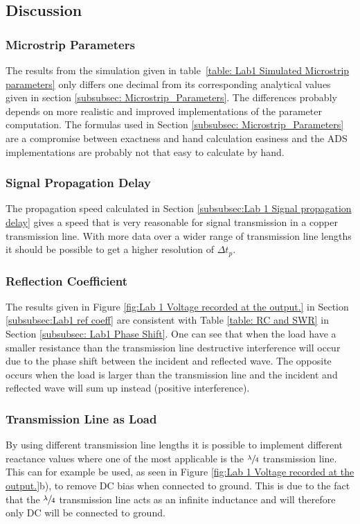 \documentclass[report.tex]{subfiles}
\begin{document}
\subsection{Discussion}
\subsubsection{Microstrip Parameters}
The results from the simulation given in table~\ref{table: Lab1 Simulated Microstrip parameters} only differs one decimal from its corresponding analytical values given in section \ref{subsubsec: Microstrip_Parameters}. The differences probably depends on more realistic and improved implementations of the parameter computation. The formulas used in Section \ref{subsubsec: Microstrip_Parameters} are a compromise between exactness and hand calculation easiness and the ADS implementations are probably not that easy to calculate by hand.
\subsubsection{Signal Propagation Delay}
The propagation speed calculated in Section \ref{subsubsec:Lab 1 Signal propagation delay} gives a speed that is very reasonable for signal transmission in a copper transmission line. With more data over a wider range of transmission line lengths it should be possible to get a higher resolution of $\Delta t_p$.
\subsubsection{Reflection Coefficient}
The results given in Figure \ref{fig:Lab 1 Voltage recorded at the output.} in Section \ref{subsubsec:Lab1 ref coeff} are consistent with Table \ref{table: RC and SWR} in Section \ref{subsubsec: Lab1 Phase Shift}. One can see that when the load have a smaller resistance than the transmission line destructive interference will occur due to the phase shift between the incident and reflected wave. The opposite occurs when the load is larger than the transmission line and the incident and reflected wave will sum up instead (positive interference).
\subsubsection{Transmission Line as Load}
By using different transmission line lengths it is possible to implement different reactance values where one of the most applicable is the $\sfrac{\lambda}{4}$ transmission line. This can for example be used, as seen in Figure \ref{fig:Lab 1 Voltage recorded at the output.}b), to remove DC bias when connected to ground. This is due to the fact that the  $\sfrac{\lambda}{4}$ transmission line acts as an infinite inductance and will therefore only DC will be connected to ground.
\end{document}
